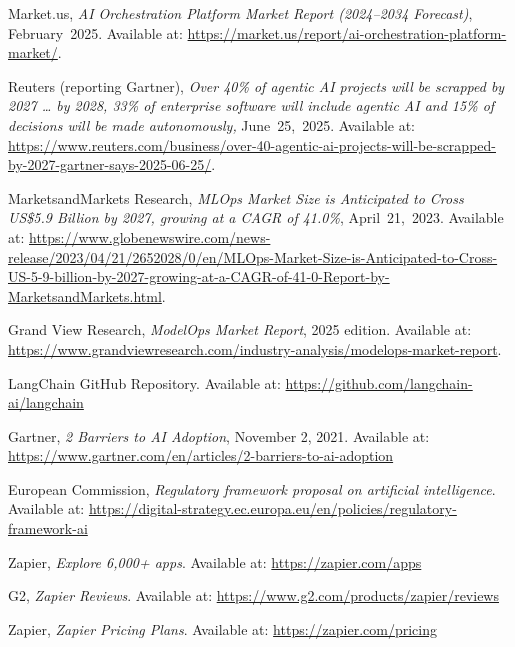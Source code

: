 \documentclass[11点, A4纸, 单面]{article}
\begin{document}
\newpage
\begin{thebibliography}{99}

    Market.us, \textit{AI Orchestration Platform Market Report (2024--2034 Forecast)}, February~2025.  
    Available at: \url{https://market.us/report/ai-orchestration-platform-market/}.
    
    Reuters (reporting Gartner), \textit{Over 40\% of agentic AI projects will be scrapped by 2027 … by 2028, 33\% of enterprise software will include agentic AI and 15\% of decisions will be made autonomously,} June~25,~2025.
    Available at: \url{https://www.reuters.com/business/over-40-agentic-ai-projects-will-be-scrapped-by-2027-gartner-says-2025-06-25/}.

    MarketsandMarkets Research, \textit{MLOps Market Size is Anticipated to Cross US\$5.9 Billion by 2027, growing at a CAGR of 41.0\%}, April~21,~2023.
    Available at: \url{https://www.globenewswire.com/news-release/2023/04/21/2652028/0/en/MLOps-Market-Size-is-Anticipated-to-Cross-US-5-9-billion-by-2027-growing-at-a-CAGR-of-41-0-Report-by-MarketsandMarkets.html}.

    Grand View Research, \textit{ModelOps Market Report}, 2025 edition.  
    Available at: \url{https://www.grandviewresearch.com/industry-analysis/modelops-market-report}.
    
    LangChain GitHub Repository.
    Available at: \url{https://github.com/langchain-ai/langchain}

    Gartner, \textit{2 Barriers to AI Adoption}, November 2, 2021. Available at: \url{https://www.gartner.com/en/articles/2-barriers-to-ai-adoption}

    European Commission, \textit{Regulatory framework proposal on artificial intelligence}.
    Available at: \url{https://digital-strategy.ec.europa.eu/en/policies/regulatory-framework-ai}
    
    Zapier, \textit{Explore 6,000+ apps}.
    Available at: \url{https://zapier.com/apps}

    G2, \textit{Zapier Reviews}.
    Available at: \url{https://www.g2.com/products/zapier/reviews}

    Zapier, \textit{Zapier Pricing Plans}.
    Available at: \url{https://zapier.com/pricing}


\end{thebibliography}
\end{document}
